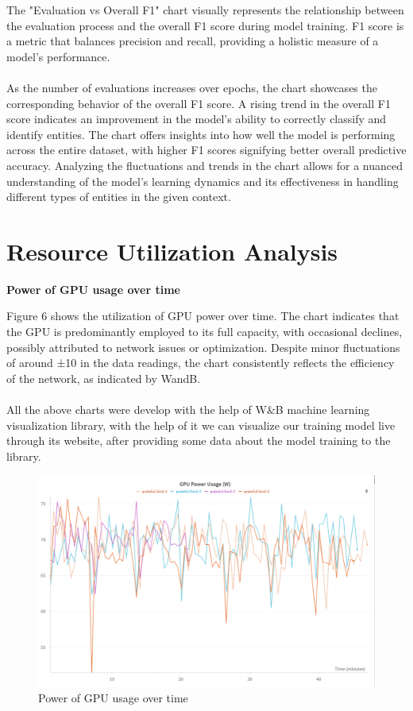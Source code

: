  
The "Evaluation vs Overall F1" chart visually represents the relationship between the evaluation process and the overall F1 score during model training. F1 score is a metric that balances precision and recall, providing a holistic measure of a model's performance.\\
\\
As the number of evaluations increases over epochs, the chart showcases the corresponding behavior of the overall F1 score. A rising trend in the overall F1 score indicates an improvement in the model's ability to correctly classify and identify entities. The chart offers insights into how well the model is performing across the entire dataset, with higher F1 scores signifying better overall predictive accuracy. Analyzing the fluctuations and trends in the chart allows for a nuanced understanding of the model's learning dynamics and its effectiveness in handling different types of entities in the given context.



\section{Resource Utilization Analysis}
\vspace{10pt}
\textbf{Power of GPU usage over time}

Figure 6 shows the utilization of GPU power over time. The chart indicates that the GPU is predominantly employed to its full capacity, with occasional declines, possibly attributed to network issues or optimization. Despite minor fluctuations of around ±10 in the data readings, the chart consistently reflects the efficiency of the network, as indicated by WandB.\\
\\
All the above charts were develop with the help of W\&B machine learning visualization library, with the help of it we can visualize our training model live through its website, after providing some data about the model training to the library.

\begin{figure}[H]
\centering
\includegraphics [scale=0.55]{img/result & analysis/Power of GPU usage over time.png}
 \caption[Power of GPU usage over times]{Power of GPU usage over time}

\end{figure}

